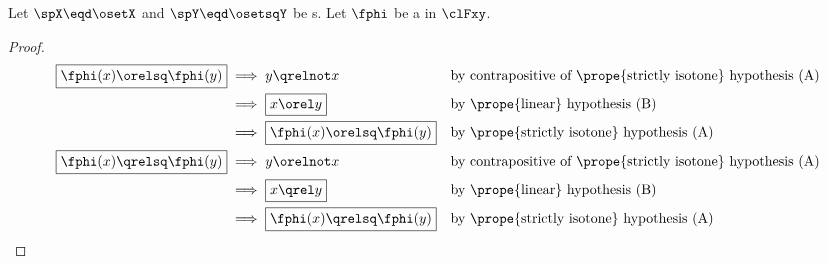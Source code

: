 \begin{lemma}
\label{lem:linisoiff}
Let $\spX\eqd\osetX$ and $\spY\eqd\osetsqY$ be s.
Let $\fphi$ be a  in $\clFxy$.
\\
\end{lemma}
\begin{proof}
\begin{align*}
  \boxed{\fphi(x)\orelsq\fphi(y)} 
    &\implies y \qrelnot x           && \text{by contrapositive of \prope{strictly isotone} hypothesis (A)}
  \\&\implies \boxed{x \orel y}      && \text{by \prope{linear} hypothesis (B)}
  \\&\implies \boxed{\fphi(x)\orelsq\fphi(y)} && \text{by \prope{strictly isotone} hypothesis (A)}
  \\
  \boxed{\fphi(x)\qrelsq\fphi(y)} 
    &\implies y \orelnot x           && \text{by contrapositive of \prope{strictly isotone} hypothesis (A)}
  \\&\implies \boxed{x \qrel y}      && \text{by \prope{linear} hypothesis (B)}
  \\&\implies \boxed{\fphi(x)\qrelsq\fphi(y)} && \text{by \prope{strictly isotone} hypothesis (A)}
\end{align*}
\end{proof}

